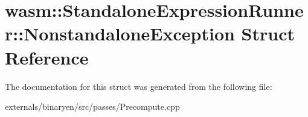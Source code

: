 \hypertarget{structwasm_1_1_standalone_expression_runner_1_1_nonstandalone_exception}{}\section{wasm\+:\+:Standalone\+Expression\+Runner\+:\+:Nonstandalone\+Exception Struct Reference}
\label{structwasm_1_1_standalone_expression_runner_1_1_nonstandalone_exception}


The documentation for this struct was generated from the following file\+:\begin{DoxyCompactItemize}
\item 
externals/binaryen/src/passes/Precompute.\+cpp\end{DoxyCompactItemize}

